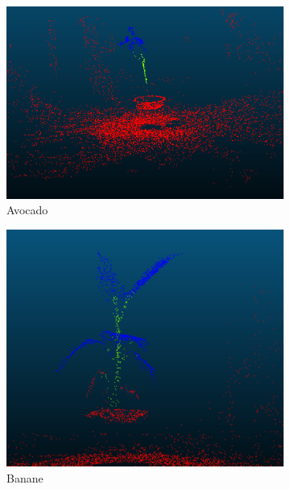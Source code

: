 \documentclass[12pt,titlepage, twoside]{article}
\begin{document}
\begin{figure}[htb]
\medskip
\begin{subfigure}{0.24\textwidth}
  \includegraphics[width=\linewidth]{./Images/BG_Avocado.png}
  \caption{Avocado}
  \label{fig:segmentation:compare:5}
\end{subfigure}\hfil 
\begin{subfigure}{0.24\textwidth}
  \includegraphics[width=\linewidth]{./Images/BG_Banana.png}
  \caption{Banane}
  \label{fig:segmentation:compare:6}
\end{subfigure}\hfil 
\begin{subfigure}{0.24\textwidth}

\end{subfigure}
\end{figure}
\end{document}
